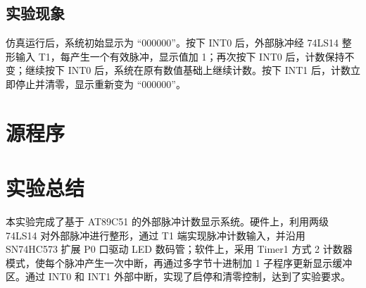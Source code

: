 \subsection{实验现象}
仿真运行后，系统初始显示为 ``000000''。按下 INT0 后，外部脉冲经 74LS14 整形输入 T1，每产生一个有效脉冲，显示值加 1；再次按下 INT0 后，计数保持不变；继续按下 INT0 后，系统在原有数值基础上继续计数。按下 INT1 后，计数立即停止并清零，显示重新变为 ``000000''。

\section{源程序}



\section{实验总结}
本实验完成了基于 AT89C51 的外部脉冲计数显示系统。硬件上，利用两级 74LS14 对外部脉冲进行整形，通过 T1 端实现脉冲计数输入，并沿用 SN74HC573 扩展 P0 口驱动 LED 数码管；软件上，采用 Timer1 方式 2 计数器模式，使每个脉冲产生一次中断，再通过多字节十进制加 1 子程序更新显示缓冲区。通过 INT0 和 INT1 外部中断，实现了启停和清零控制，达到了实验要求。
